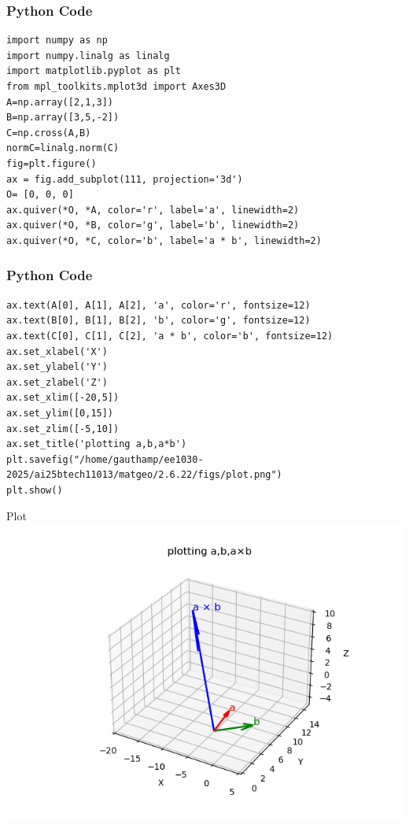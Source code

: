 \documentclass{beamer}
\begin{document}
\begin{frame}[fragile]
    \frametitle{Python Code}
    \begin{lstlisting}
import numpy as np
import numpy.linalg as linalg
import matplotlib.pyplot as plt
from mpl_toolkits.mplot3d import Axes3D
A=np.array([2,1,3])
B=np.array([3,5,-2])
C=np.cross(A,B)
normC=linalg.norm(C)
fig=plt.figure()
ax = fig.add_subplot(111, projection='3d') 
O= [0, 0, 0] 
ax.quiver(*O, *A, color='r', label='a', linewidth=2) 
ax.quiver(*O, *B, color='g', label='b', linewidth=2)
ax.quiver(*O, *C, color='b', label='a * b', linewidth=2)
    \end{lstlisting}
\end{frame}

\begin{frame}[fragile]
    \frametitle{Python Code}
    \begin{lstlisting}
ax.text(A[0], A[1], A[2], 'a', color='r', fontsize=12)
ax.text(B[0], B[1], B[2], 'b', color='g', fontsize=12)
ax.text(C[0], C[1], C[2], 'a * b', color='b', fontsize=12)
ax.set_xlabel('X')
ax.set_ylabel('Y')
ax.set_zlabel('Z')
ax.set_xlim([-20,5]) 
ax.set_ylim([0,15])
ax.set_zlim([-5,10])
ax.set_title('plotting a,b,a*b')
plt.savefig("/home/gauthamp/ee1030-2025/ai25btech11013/matgeo/2.6.22/figs/plot.png")
plt.show()
    \end{lstlisting}
\end{frame}

\begin{frame}{Plot}
    \centering
    \includegraphics[width=\columnwidth, height=0.8\textheight, keepaspectratio]{figs/plot.png}     
\end{frame}
\end{document}
